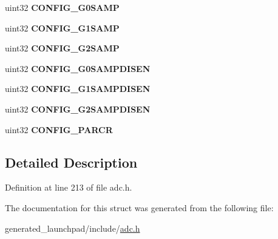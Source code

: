 \begin{DoxyCompactItemize}
\mbox{\label{structadc__config__reg_ab0c2e5b0bca3504af600d52a3eb63228}} 
uint32 {\bfseries C\+O\+N\+F\+I\+G\+\_\+\+G0\+S\+A\+MP}
\item 
\mbox{\label{structadc__config__reg_aa01bc613f6c03ed14158badb8eced76b}} 
uint32 {\bfseries C\+O\+N\+F\+I\+G\+\_\+\+G1\+S\+A\+MP}
\item 
\mbox{\label{structadc__config__reg_afe7eb2e261f5980c176d847b91245d5f}} 
uint32 {\bfseries C\+O\+N\+F\+I\+G\+\_\+\+G2\+S\+A\+MP}
\item 
\mbox{\label{structadc__config__reg_a3aca55ca19b15410c7dda8a589df9392}} 
uint32 {\bfseries C\+O\+N\+F\+I\+G\+\_\+\+G0\+S\+A\+M\+P\+D\+I\+S\+EN}
\item 
\mbox{\label{structadc__config__reg_a9816a5959de1d8cc5995af0c4e6f7e2d}} 
uint32 {\bfseries C\+O\+N\+F\+I\+G\+\_\+\+G1\+S\+A\+M\+P\+D\+I\+S\+EN}
\item 
\mbox{\label{structadc__config__reg_a85d3c454498f182184356c855f283002}} 
uint32 {\bfseries C\+O\+N\+F\+I\+G\+\_\+\+G2\+S\+A\+M\+P\+D\+I\+S\+EN}
\item 
\mbox{\label{structadc__config__reg_a252fc178fccada2cf114edea35e6bd2f}} 
uint32 {\bfseries C\+O\+N\+F\+I\+G\+\_\+\+P\+A\+R\+CR}
\end{DoxyCompactItemize}


\subsection{Detailed Description}


Definition at line 213 of file adc.\+h.



The documentation for this struct was generated from the following file\+:\begin{DoxyCompactItemize}
\item 
generated\+\_\+launchpad/include/\mbox{\hyperlink{adc_8h}{adc.\+h}}\end{DoxyCompactItemize}
